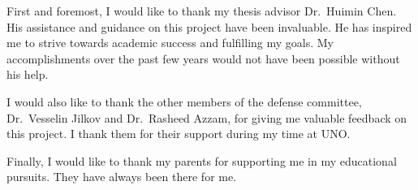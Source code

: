 First and foremost, I would like to thank my thesis advisor Dr.\ Huimin Chen. His assistance and guidance on this project have been invaluable. He has inspired me to strive towards academic success and fulfilling my goals. My accomplishments over the past few years would not have been possible without his help.

I would also like to thank the other members of the defense committee, Dr.\ Vesselin Jilkov and Dr.\ Rasheed Azzam, for giving me valuable feedback on this project. I thank them for their support during my time at UNO.

Finally, I would like to thank my parents for supporting me in my educational pursuits. They have always been there for me.

%
%



